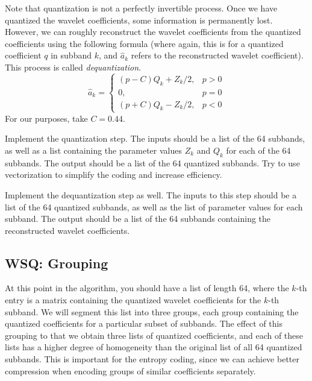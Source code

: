 Note that quantization is not a perfectly invertible process. Once we have quantized
the wavelet coefficients, some information is permanently lost. However, we can
roughly reconstruct the wavelet coefficients from the quantized coefficients 
using the following formula (where again, this is for a quantized coefficient $q$
in subband $k$, and $\hat{a}_k$ refers to the reconstructed wavelet coefficient).
This process is called \emph{dequantization}.
\[
\hat{a}_k = 
\begin{cases}
(p-C)Q_k + Z_k/2, & p> 0\\
0, & p = 0\\
(p + C)Q_k - Z_k/2, & p < 0
\end{cases}
\]
For our purposes, take $C = 0.44$.
\begin{problem}
Implement the quantization step. The inputs should be a list of the 64 subbands, as
well as a list containing the parameter values $Z_k$ and $Q_k$ for each of the 64
subbands. The output should be a list of the 64 quantized subbands. Try to use
vectorization to simplify the coding and increase efficiency. 

Implement the dequantization step as well. The inputs to this step should be
a list of the 64 quantized subbands, as well as the list of parameter values
for each subband. The output should be a list of the 64 subbands containing
the reconstructed wavelet coefficients.
\end{problem}
\subsection*{WSQ: Grouping}
At this point in the algorithm, you should have a list of length 64, where the $k$-th 
entry is a matrix containing the quantized wavelet coefficients for the $k$-th subband.
We will segment this list into three groups, each group containing the quantized coefficients
for a particular subset of subbands. The effect of this grouping to that we obtain three
lists of quantized coefficients, and each of these lists has a higher degree of homogeneity
than the original list of all 64 quantized subbands. This is important for the entropy coding,
since we can achieve better compression when encoding groups of similar coefficients separately.

